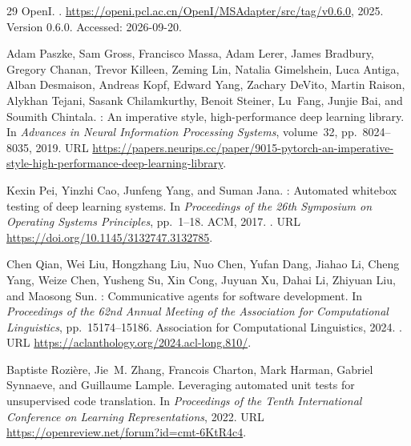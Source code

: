 \documentclass{article}
\begin{document}
\begin{thebibliography}{29}
{OpenI}.
.
\newblock \url{https://openi.pcl.ac.cn/OpenI/MSAdapter/src/tag/v0.6.0}, 2025.
\newblock Version 0.6.0. Accessed: 2026-09-20.

Adam Paszke, Sam Gross, Francisco Massa, Adam Lerer, James Bradbury, Gregory
  Chanan, Trevor Killeen, Zeming Lin, Natalia Gimelshein, Luca Antiga, Alban
  Desmaison, Andreas Kopf, Edward Yang, Zachary DeVito, Martin Raison, Alykhan
  Tejani, Sasank Chilamkurthy, Benoit Steiner, Lu~Fang, Junjie Bai, and Soumith
  Chintala.
: An imperative style, high-performance deep learning
  library.
\newblock In \emph{Advances in Neural Information Processing Systems},
  volume~32, pp.\  8024--8035, 2019.
\newblock URL
  \url{https://papers.neurips.cc/paper/9015-pytorch-an-imperative-style-high-performance-deep-learning-library}.

Kexin Pei, Yinzhi Cao, Junfeng Yang, and Suman Jana.
: Automated whitebox testing of deep learning systems.
\newblock In \emph{Proceedings of the 26th Symposium on Operating Systems
  Principles}, pp.\  1--18. ACM, 2017.
\newblock {}.
\newblock URL \url{https://doi.org/10.1145/3132747.3132785}.

Chen Qian, Wei Liu, Hongzhang Liu, Nuo Chen, Yufan Dang, Jiahao Li, Cheng Yang,
  Weize Chen, Yusheng Su, Xin Cong, Juyuan Xu, Dahai Li, Zhiyuan Liu, and
  Maosong Sun.
: Communicative agents for software development.
\newblock In \emph{Proceedings of the 62nd Annual Meeting of the Association
  for Computational Linguistics}, pp.\  15174--15186. Association for
  Computational Linguistics, 2024.
\newblock {}.
\newblock URL \url{https://aclanthology.org/2024.acl-long.810/}.

Baptiste Rozi{\`e}re, Jie~M. Zhang, Francois Charton, Mark Harman, Gabriel
  Synnaeve, and Guillaume Lample.
\newblock Leveraging automated unit tests for unsupervised code translation.
\newblock In \emph{Proceedings of the Tenth International Conference on
  Learning Representations}, 2022.
\newblock URL \url{https://openreview.net/forum?id=cmt-6KtR4c4}.


\end{thebibliography}
\end{document}
